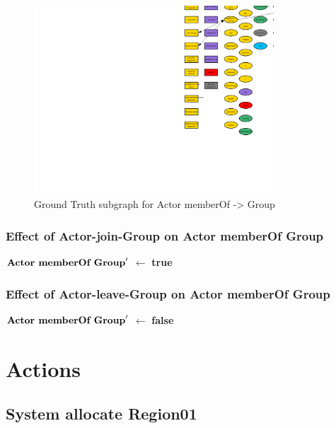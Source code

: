 \documentclass{article}%
\begin{document}
\begin{figure}[ht]%
\centering%
\includegraphics[width=0.8\textwidth]{images/ActormemberOf->Group.png}%
\caption{Ground Truth subgraph for Actor memberOf {-}> Group}%
\end{figure}

%
\subsubsection{Effect of Actor{-}join{-}Group on Actor memberOf Group}%
\label{ssubsec:Effect of Actor{-}join{-}Group on Actor memberOf Group}%
\begin{flushleft}%
$\mbox{\textbf{Actor memberOf Group}} '$%
$\leftarrow$%
\textbf{true}%
\end{flushleft}

%
\subsubsection{Effect of Actor{-}leave{-}Group on Actor memberOf Group}%
\label{ssubsec:Effect of Actor{-}leave{-}Group on Actor memberOf Group}%
\begin{flushleft}%
$\mbox{\textbf{Actor memberOf Group}} '$%
$\leftarrow$%
\textbf{false}%
\end{flushleft}

%
\section{Actions}%
\label{sec:Actions}%
\subsection{System allocate Region01}%
\label{subsec:System allocate Region01}%
\end{document}
